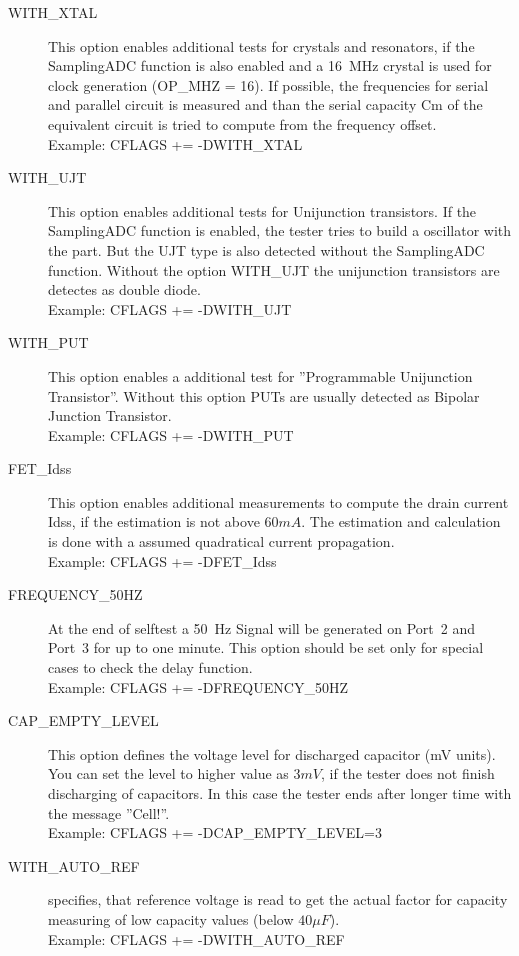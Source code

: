 \begin{description}
  \item[WITH\_XTAL]
This option enables additional tests for crystals and resonators, if the SamplingADC function is also enabled and
a 16~MHz crystal is used for clock generation (OP\_MHZ = 16).
If possible, the frequencies for serial and parallel circuit is measured and than the serial capacity Cm of the
equivalent circuit is tried to compute from the frequency offset.\\
Example: CFLAGS += -DWITH\_XTAL

  \item[WITH\_UJT]
This option enables additional tests for  Unijunction transistors. 
If the SamplingADC function is enabled, the tester tries to build a oscillator with the part.
But the UJT type is also detected without the SamplingADC function.
Without the option WITH\_UJT the unijunction transistors are detectes as double diode.\\
Example: CFLAGS += -DWITH\_UJT

  \item[WITH\_PUT]
This option enables a additional test for ''Programmable Unijunction Transistor''.
Without this option PUTs are usually detected as Bipolar Junction Transistor.\\
Example: CFLAGS += -DWITH\_PUT

 \item[FET\_Idss]
This option enables additional measurements to compute the drain current Idss, if the estimation is not
above \(60mA\). The estimation and calculation is done with a assumed quadratical current propagation.\\
Example: CFLAGS += -DFET\_Idss

  \item[FREQUENCY\_50HZ] At the end of selftest a 50~Hz Signal will be generated on Port~2 and Port~3 for up to one minute.
 This option should be set only for special cases to check the delay function.\\
Example: CFLAGS += -DFREQUENCY\_50HZ

  \item[CAP\_EMPTY\_LEVEL]  This option defines the voltage level for discharged capacitor (mV units).
You can set the level to higher value as \(3mV\), if the tester does not finish discharging of capacitors.
In this case the tester ends after longer time with the message ''Cell!''.\\
Example: CFLAGS += -DCAP\_EMPTY\_LEVEL=3

  \item[WITH\_AUTO\_REF] specifies, that reference voltage is read to get the actual factor for capacity measuring of low capacity values (below \(40\mu F\)).\\
Example:  CFLAGS += -DWITH\_AUTO\_REF


\end{description}
